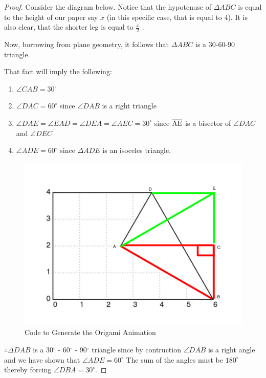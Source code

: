 \documentclass{article}
\begin{document}
        \newpage
        \begin{proof}
            Consider the diagram below. Notice that the hypotenuse of $\Delta ABC$
            is equal to the height of our paper say $x$ (in this specific case, that is equal to 4).
            It is also clear, that the shorter leg is equal to $\frac{x}{2}$ .
           
            Now, borrowing from plane geometry, it follows that $\Delta ABC$ is a 30-60-90 triangle.

            That fact will imply the following:

            \begin{enumerate}
                \item $\angle CAB = 30^{\circ}$
                \item $\angle DAC = 60^{\circ}$ since $\angle DAB$ is a right triangle
                \item $\angle DAE = \angle EAD = \angle DEA = \angle AEC = 30^{\circ} $ since $\overline{\rm AE}$ is a bisector of 
                $\angle DAC$ and $\angle DEC$
                \item $\angle ADE = 60^{\circ}$ since $\Delta ADE$ is an isoceles triangle.
            \end{enumerate}

            \begin{figure}[h!]
                \centering
                \includegraphics[width=1\textwidth]{306090_1.png}
                \caption{Code to Generate the Origami Animation}
            \end{figure}
            \newpage
            $\therefore \Delta DAB$ is a 30$^{\circ}$ - 60$^{\circ}$ - 90$^{\circ}$ triangle since
            by contruction $\angle DAB$ is a right angle and we have shown that $\angle ADE = 60^{\circ}$ 
            The sum of the angles must be $180^{\circ}$ thereby forcing $\angle DBA = 30^{\circ}$.

        \end{proof}
\end{document}
